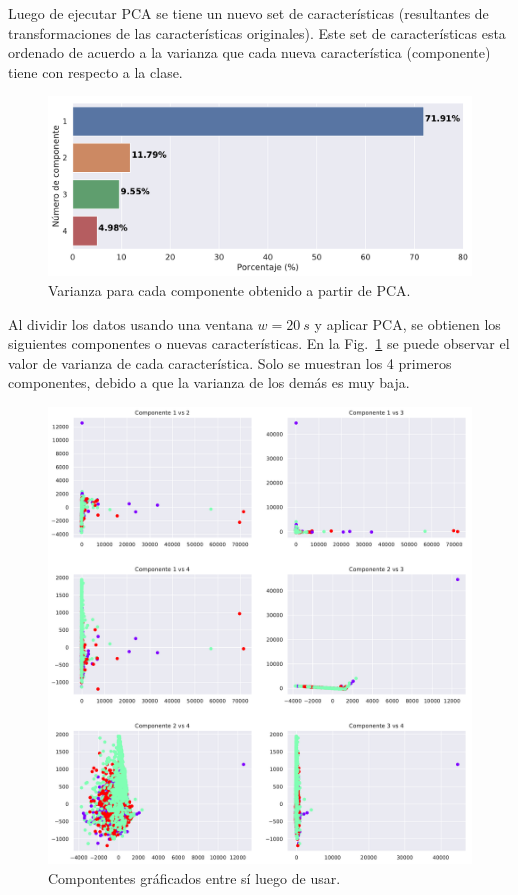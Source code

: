 Luego de ejecutar PCA se tiene un nuevo set de características (resultantes de transformaciones de las características originales). Este set de características esta ordenado de acuerdo a la varianza que cada nueva característica (componente) tiene con respecto a la clase.

\begin{figure}[hbt!]
\centering
\includegraphics[width=\textwidth]{PCA_dist.pdf}
\caption{Varianza para cada componente obtenido a partir de PCA.}
\label{fig:PCA_dist}
\end{figure}

Al dividir los datos usando una ventana $w=\SI{20}{s}$ y aplicar PCA, se obtienen los siguientes componentes o nuevas características. En la Fig.~\ref{fig:PCA_dist} se puede observar el valor de varianza de cada característica. Solo se muestran los 4 primeros componentes, debido a que la varianza de los demás es muy baja.

\begin{figure}[hbt!]
\centering
\includegraphics[width=\textwidth]{PCA_vs.pdf}
\caption{Compontentes gráficados entre sí luego de usar.}
\label{fig:PCA_vs}
\end{figure}

